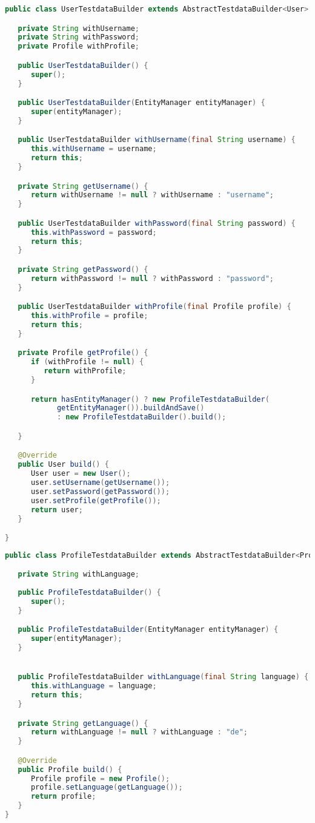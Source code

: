 \begin{lstlisting}[language={JAVA},caption=User Testdatabuilder]
public class UserTestdataBuilder extends AbstractTestdataBuilder<User> {

   private String withUsername;
   private String withPassword;
   private Profile withProfile;

   public UserTestdataBuilder() {
      super();
   }

   public UserTestdataBuilder(EntityManager entityManager) {
      super(entityManager);
   }

   public UserTestdataBuilder withUsername(final String username) {
      this.withUsername = username;
      return this;
   }

   private String getUsername() {
      return withUsername != null ? withUsername : "username";
   }

   public UserTestdataBuilder withPassword(final String password) {
      this.withPassword = password;
      return this;
   }

   private String getPassword() {
      return withPassword != null ? withPassword : "password";
   }

   public UserTestdataBuilder withProfile(final Profile profile) {
      this.withProfile = profile;
      return this;
   }

   private Profile getProfile() {
      if (withProfile != null) {
         return withProfile;
      }

      return hasEntityManager() ? new ProfileTestdataBuilder(
            getEntityManager()).buildAndSave()
            : new ProfileTestdataBuilder().build();

   }

   @Override
   public User build() {
      User user = new User();
      user.setUsername(getUsername());
      user.setPassword(getPassword());
      user.setProfile(getProfile());
      return user;
   }

}
\end{lstlisting}

\begin{lstlisting}[language={JAVA},caption=Profile Testdatabuilder]
public class ProfileTestdataBuilder extends AbstractTestdataBuilder<Profile> {

   private String withLanguage;
   
   public ProfileTestdataBuilder() {
      super();
   }

   public ProfileTestdataBuilder(EntityManager entityManager) {
      super(entityManager);
   }


   public ProfileTestdataBuilder withLanguage(final String language) {
      this.withLanguage = language;
      return this;
   }

   private String getLanguage() {
      return withLanguage != null ? withLanguage : "de";
   }

   @Override
   public Profile build() {
      Profile profile = new Profile();
      profile.setLanguage(getLanguage());
      return profile;
   }
}
\end{lstlisting}

